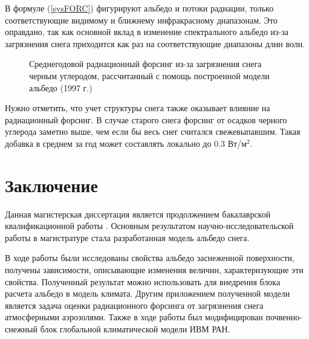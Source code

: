 \documentclass[a4paper, fontsize=14pt]{scrartcl}
\begin{document}
В формуле (\ref{sysFORC}) фигурируют альбедо и потоки радиации, только соответствующие видимому и ближнему инфракрасному диапазонам. Это оправдано, так как основной вклад в изменение спектрального альбедо из-за загрязнения снега приходится как раз на соответствующие диапазоны длин волн.

\begin{figure}[h]
    \caption{Среднегодовой радиационный форсинг из-за загрязнения снега черным углеродом, рассчитанный с помощь построенной модели альбедо (1997 г.)}
    \label{fig:image}
\end{figure}

Нужно отметить, что учет структуры снега также оказывает влияние на радиационный форсинг. В случае старого снега форсинг от осадков черного углерода заметно выше, чем если бы весь снег считался свежевыпавшим. Такая добавка в среднем за год может составлять локально до $0.3$ Вт/м$^2$. 



\newpage
\section*{Заключение}

Данная магистерская диссертация является продолжением бакалаврской квалификационной работы \cite{Bak2019}. Основным результатом научно-исследовательской работы в магистратуре стала разработанная модель альбедо снега. 

В ходе работы были исследованы свойства альбедо заснеженной поверхности, получены зависимости, описывающие изменения величин, характеризующие эти свойства. Полученный результат можно использовать для внедрения блока расчета альбедо в модель климата. Другим приложением полученной модели является задача оценки радиационного форсинга от загрязнения снега атмосферными аэрозолями. Также в ходе работы был модифицирован почвенно-снежный блок глобальной климатической модели ИВМ РАН. 




\newpage
{}
{}


\end{document}
